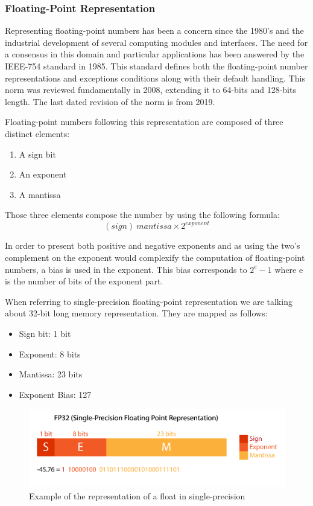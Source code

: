 \subsubsection{Floating-Point Representation}

Representing floating-point numbers has been a concern since the 1980's and the industrial development of several computing modules and interfaces. The need for a consensus in this domain and particular applications has been answered by the IEEE-754 standard \cite{Ieee754} in 1985. This standard defines both the floating-point number representations and exceptions conditions along with their default handling. This norm was reviewed fundamentally in 2008, extending it to 64-bits and 128-bits length. The last dated revision of the norm is from 2019.

Floating-point numbers following this representation are composed of three distinct elements:
\begin{enumerate}
  \item A sign bit
  \item An exponent
  \item A mantissa
\end{enumerate}

Those three elements compose the number by using the following formula:
\begin{equation}
  (sign)\ mantissa \times 2^{exponent}
\end{equation}

In order to present both positive and negative exponents and as using the two's complement on the exponent would complexify the computation of floating-point numbers, a bias is used in the exponent. This bias corresponds to $2^e - 1$ where e is the number of bits of the exponent part.

When referring to single-precision floating-point representation we are talking about 32-bit long memory representation. They are mapped as follows:
\begin{itemize}
  \item Sign bit: 1 bit
  \item Exponent: 8 bits
  \item Mantissa: 23 bits
  \item Exponent Bias: 127
\end{itemize}

\begin{figure}[htbp]
	\centering
		\includegraphics[width=12cm]{Figures/FP32.png}
	\caption[Single-precision float representation]{Example of the representation of a float in single-precision}
	\label{fig:FP32}
\end{figure}

